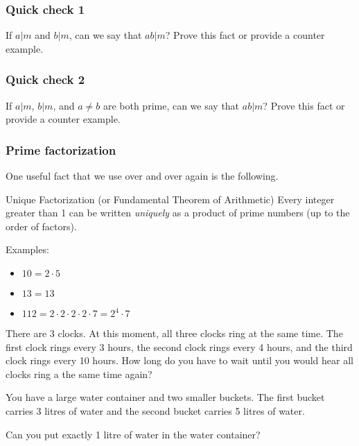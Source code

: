 

\begin{frame}
  \frametitle{Quick check 1} 

  If $a|m$ and $b|m$, can we say that $ab|m$?  Prove this fact or
  provide a counter example.
\end{frame}

\begin{frame}
  \frametitle{Quick check 2}

  If $a|m$, $b|m$, and $a\neq b$ are both prime, can we say that
  $ab|m$?  Prove this fact or provide a counter example.
\end{frame}

\begin{frame}
  \frametitle{Prime factorization}

  One useful fact that we use over and over again is the following.

  \begin{block}{Unique Factorization (or Fundamental Theorem of Arithmetic)}
    Every integer greater than 1 can be written {\em uniquely} as a
    product of prime numbers (up to the order of factors).
  \end{block}

  \vspace{0.2in}
  Examples:
  \begin{itemize}
  \item $10 = 2\cdot 5$
  \item $13 = 13$
  \item $112 = 2\cdot 2\cdot 2\cdot 2\cdot 7=2^4\cdot 7$
  \end{itemize}
\end{frame}

\begin{frame}
  There are 3 clocks.  At this moment, all three clocks ring at the
  same time.  The first clock rings every 3 hours, the second clock
  rings every 4 hours, and the third clock rings every 10 hours.  How
  long do you have to wait until you would hear all clocks ring a the
  same time again?
  
\end{frame}

\begin{frame}
  You have a large water container and two smaller buckets. The first
  bucket carries 3 litres of water and the second bucket carries 5
  litres of water.

  Can you put exactly 1 litre of water in the water container?
\end{frame}

